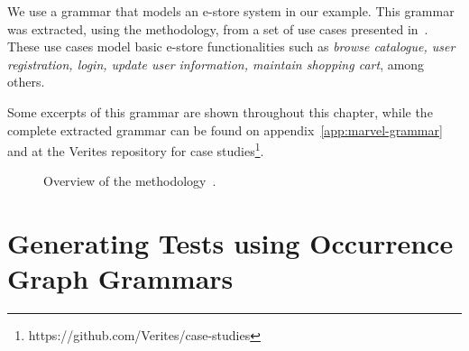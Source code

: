 We use a grammar that models an e-store system in our example. This grammar was extracted, using the methodology, from a set of use cases presented in~\cite{Goins2007}. These use cases model basic e-store functionalities such as \emph{browse catalogue, user registration, login, update user information, maintain shopping cart}, among others.

Some excerpts of this grammar are shown throughout this chapter, while the complete extracted grammar can be found on appendix~\ref{app:marvel-grammar} and at the Verites repository for case studies\footnote{https://github.com/Verites/case-studies}.

\begin{figure}[!ht]
  \centering
  \caption{Overview of the methodology~\cite{Junior2015}.}\label{fig:tests:methodology}
\end{figure}

\section{Generating Tests using Occurrence Graph Grammars}

